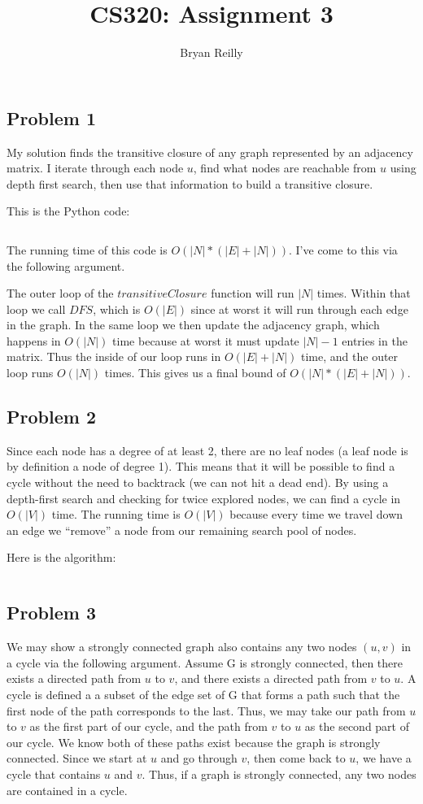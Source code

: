 \documentclass{article}
\author{Bryan Reilly}
\title{CS320: Assignment 3}
\begin{document}
\maketitle{}

\subsection*{Problem 1}
My solution finds the transitive closure of any graph represented by an adjacency matrix.
I iterate through each node $u$,
find what nodes are reachable from $u$ using depth first search,
then use that information to build a transitive closure.

This is the Python code:

\inputminted{python}{q1.py}

The running time of this code is $O( |N| * (|E|+|N|) )$.
I've come to this via the following argument.

The outer loop of the $transitiveClosure$ function will run $|N|$ times.
Within that loop we call $DFS$, which is $O(|E|)$ since at worst it will run through each edge in the graph.
In the same loop we then update the adjacency graph, which happens in $O(|N|)$ time because at worst it must update $|N|-1$ entries in the matrix.
Thus the inside of our loop runs in $O(|E| + |N|)$ time, and the outer loop runs $O(|N|)$ times.
This gives us a final bound of $O( |N| * (|E|+|N|) )$.


\subsection*{Problem 2}
Since each node has a degree of at least 2, there are no leaf nodes
(a leaf node is by definition a node of degree 1).
This means that it will be possible to find a cycle without the need to backtrack
(we can not hit a dead end).
By using a depth-first search and checking for twice explored nodes, we can find a cycle in $O(|V|)$ time.
The running time is $O(|V|)$ because every time we travel down an edge we ``remove'' a node from our remaining search pool of nodes.

Here is the algorithm:

\inputminted{python}{q2.py}

\subsection*{Problem 3}
We may show a strongly connected graph also contains any two nodes $(u,v)$ in a cycle
via the following argument.
Assume G is strongly connected, then there exists a directed path from $u$ to $v$,
and there exists a directed path from $v$ to $u$.
A cycle is defined a a subset of the edge set of G that forms a path such that the first node of the path corresponds to the last.
Thus, we may take our path from $u$ to $v$ as the first part of our cycle, and the path from $v$ to $u$ as the second part of our cycle.
We know both of these paths exist because the graph is strongly connected.
Since we start at $u$ and go through $v$, then come back to $u$, we have a cycle that contains $u$ and $v$.
Thus, if a graph is strongly connected, any two nodes are contained in a cycle.
\end{document}
